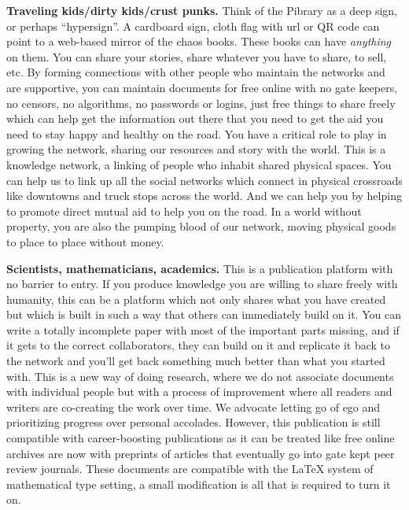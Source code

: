 \textbf{Traveling kids/dirty kids/crust punks.} Think of the Pibrary as
a deep sign, or perhaps ``hypersign''. A cardboard sign, cloth flag with
url or QR code can point to a web-based mirror of the chaos books. These
books can have \emph{anything} on them. You can share your stories,
share whatever you have to share, to sell, etc. By forming connections
with other people who maintain the networks and are supportive, you can
maintain documents for free online with no gate keepers, no censors, no
algorithms, no passwords or logins, just free things to share freely
which can help get the information out there that you need to get the
aid you need to stay happy and healthy on the road. You have a critical
role to play in growing the network, sharing our resources and story
with the world. This is a knowledge network, a linking of people who
inhabit shared physical spaces. You can help us to link up all the
social networks which connect in physical crossroads like downtowns and
truck stops across the world. And we can help you by helping to promote
direct mutual aid to help you on the road. In a world without property,
you are also the pumping blood of our network, moving physical goods to
place to place without money.

\textbf{Scientists, mathematicians, academics.} This is a publication
platform with no barrier to entry. If you produce knowledge you are
willing to share freely with humanity, this can be a platform which not
only shares what you have created but which is built in such a way that
others can immediately build on it. You can write a totally incomplete
paper with most of the important parts missing, and if it gets to the
correct collaborators, they can build on it and replicate it back to the
network and you'll get back something much better than what you started
with. This is a new way of doing research, where we do not associate
documents with individual people but with a process of improvement where
all readers and writers are co-creating the work over time. We advocate
letting go of ego and prioritizing progress over personal accolades.
However, this publication is still compatible with career-boosting
publications as it can be treated like free online archives are now with
preprints of articles that eventually go into gate kept peer review
journals. These documents are compatible with the LaTeX system of
mathematical type setting, a small modification is all that is required
to turn it on.

